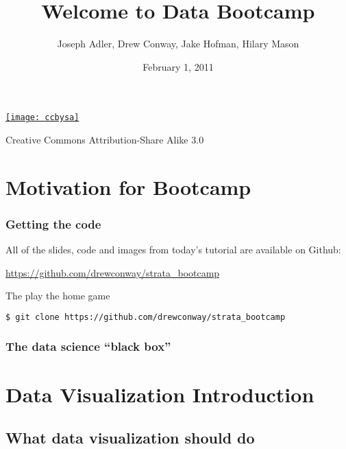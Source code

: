 \documentclass[xcolor=dvipsnames, 9pt]{beamer}
\title{Welcome to Data Bootcamp}
\author{Joseph Adler, Drew Conway, Jake Hofman, Hilary Mason}
\date{February 1, 2011}
\begin{document}
 
    
\begin{frame}[plain]
  \titlepage 

  \tiny
  \href{http://creativecommons.org/licenses/by-sa/3.0/us/}{\texttt{[image: ccbysa]}}

  Creative Commons Attribution-Share Alike 3.0
\end{frame}

\section{Motivation for Bootcamp} %
\label{sec:motivation_for_bootcamp}

\begin{frame}[fragile]
    \frametitle{Getting the code}
    All of the slides, code and images from today's tutorial are available on Github:
    \vspace{1cm}
    \begin{center}
        \LARGE{\url{https://github.com/drewconway/strata_bootcamp}}
    \end{center}
    \vspace{1cm}
    \begin{block}{The play the home game}
        \begin{lstlisting}[language=bash]
$ git clone https://github.com/drewconway/strata_bootcamp
        \end{lstlisting}
    \end{block}
\end{frame}

\begin{frame}[fragile]
    \frametitle{The data science ``black box''}
    \begin{center}
    \end{center}
\end{frame}



\section{Data Visualization Introduction} %
\label{sec:visualization}

\subsection{What data visualization should do} %
\label{sub:what_data_visualization_should_do}
\end{document}
